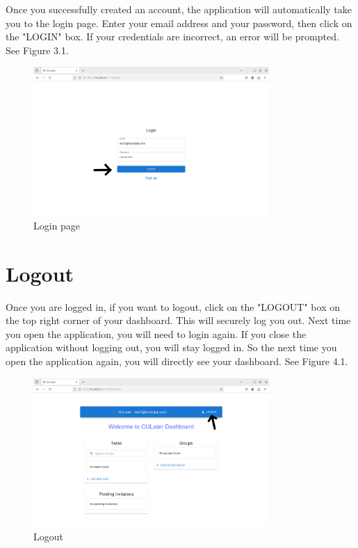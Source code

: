 \documentclass{scrreprt}
\begin{document}
Once you successfully created an account, the application will automatically take you to the login page. Enter your email address and your password, then click on the "LOGIN" box. If your credentials are incorrect, an error will be prompted. See Figure 3.1.\\
\begin{figure}[htbp]
        \centering
        \includegraphics[width=0.8\textwidth]{login_credentials_entered_w_arrow.png}
	\caption{Login page}
	\label{fig:my_label}
\end{figure}

\chapter{Logout}

Once you are logged in, if you want to logout, click on the "LOGOUT" box on the top right corner of your dashboard. This will securely log you out. Next time you open the application, you will need to login again. If you close the application without logging out, you will stay logged in. So the next time you open the application again, you will directly see your dashboard. See Figure 4.1.\\
\begin{figure}[htbp]
        \centering
        \includegraphics[width=0.8\textwidth]{logout.png}
	\caption{Logout}
	\label{fig:my_label}
\end{figure}
\end{document}
